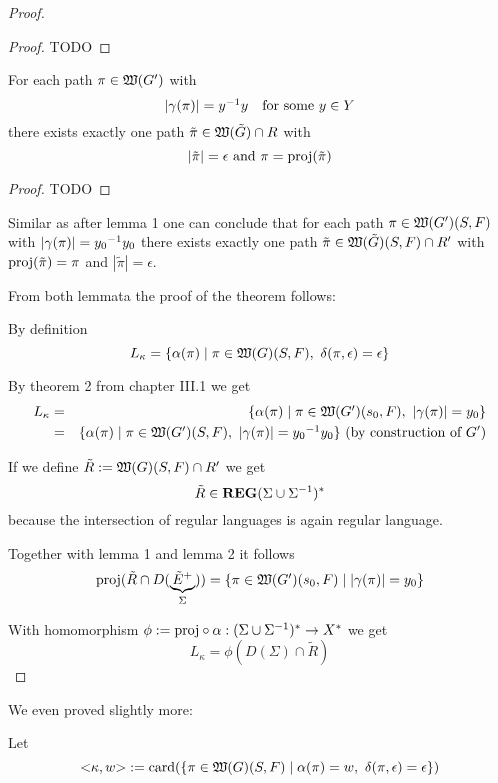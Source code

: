 \begin{proof}
\begin{proof}
TODO
\end{proof}

\begin{lemma}
For each path $\pi \in \mbox{$\mathfrak{W}({G'})$}$ with
\[ |\gamma(\pi)| = \mbox{${y}^{-1}$} y \quad\text{for some }y \in Y \]
there exists exactly one path $\tilde{\pi} \in \mbox{$\mathfrak{W}({\tilde{G}})$} \cap R$ with
\[ |\tilde{\pi}| = \epsilon\text{ and }\pi = \mathrm{proj}({\tilde{\pi}}) \] 
\end{lemma}

\begin{proof}
TODO
\end{proof}

Similar as after lemma 1 one can conclude that for each path $\pi \in
\mbox{$\mathfrak{W}({G'})$}(S, F)$ with $|\gamma(\pi)| = \mbox{${y_0}^{-1}$}y_0$ there exists exactly one
path $\tilde{\pi} \in \mbox{$\mathfrak{W}({\tilde{G}})$}(S, F) \cap R'$ with
$\mathrm{proj}({\tilde{\pi}}) = \pi$ and $|\tilde{\pi}| = \epsilon$.

From both lemmata the proof of the theorem follows:

By definition
\[ L_\kappa = \mbox{$\{\alpha(\pi) \mid \pi \in \mbox{$\mathfrak{W}({G})$}(S, F),\ \delta(\pi,
\epsilon) = \epsilon\}$} \]

By theorem 2 from chapter III.1 we get
\begin{eqnarray*}
L_\kappa &=& \mbox{$\{\alpha(\pi) \mid \pi \in \mbox{$\mathfrak{W}({G'})$}(s_0, F),\
|\gamma(\pi)| = y_0\}$} \\
&=& \mbox{$\{\alpha(\pi) \mid \pi \in \mbox{$\mathfrak{W}({G'})$}(S, F),\
|\gamma(\pi)| = \mbox{${y_0}^{-1}$} y_0\}$}\text{ (by construction of $G'$)}
\end{eqnarray*}

If we define $\tilde{R} := \mbox{$\mathfrak{W}({G})$}(S, F) \cap R'$ we get
\[ \tilde{R} \in \mbox{{\bf REG}}(\Sigma \cup {\Sigma}^{-1})^* \]
because the intersection of regular languages is again regular language.

\medskip
Together with lemma 1 and lemma 2 it follows
\[ \mathrm{proj}({\tilde{R} \cap D(\underbrace{\tilde{E}^+}_{\Sigma})}) = \mbox{$\{\pi \in
\mbox{$\mathfrak{W}({G'})$}(s_0, F) \mid |\gamma(\pi)| = y_0\}$} \]

With homomorphism $\phi := \mathrm{proj} \circ \alpha : (\Sigma \cup {\Sigma}^{-1})^*
\to X^*$ we get
\[ L_\kappa = \phi(D(\Sigma) \cap \tilde{R}) \]
\end{proof}

\bigskip
We even proved slightly more:

Let \[ {<}\kappa, w{>} := \mathrm{card}({\mbox{$\{\pi \in \mbox{$\mathfrak{W}({G})$}(S,F) \mid \alpha(\pi)
= w,\ \delta(\pi, \epsilon) = \epsilon\}$}}) \]

